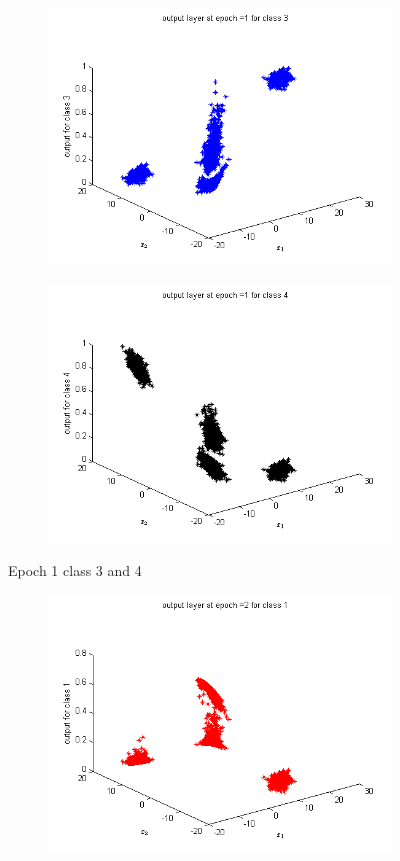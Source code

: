 \documentclass{article}
\begin{document}
\begin{flushleft}
\begin{figure}
\begin{subfigure}{.5\textwidth}
  \centering
  \includegraphics[width=.8\linewidth]{Classification/linearlySeparable/1_3}
 
\end{subfigure}%
\begin{subfigure}{.5\textwidth}
  \centering
  \includegraphics[width=.8\linewidth]{Classification/linearlySeparable/1_4}
  
\end{subfigure}
\caption{Epoch 1 class 3 and 4}
\end{figure}

\begin{figure}
\begin{subfigure}{.5\textwidth}
  \centering
  \includegraphics[width=.8\linewidth]{Classification/linearlySeparable/2_1}
 

\end{subfigure}
\end{figure}
\end{flushleft}
\end{document}
